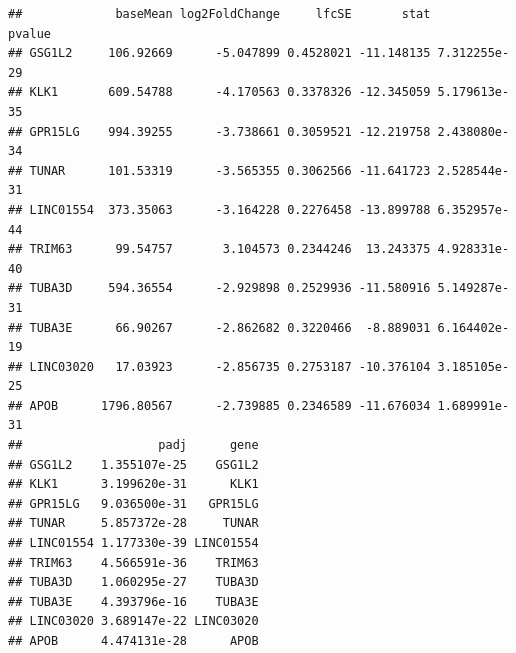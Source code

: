 \documentclass[
]{article}
\newenvironment{Shaded}{\begin{snugshade}}{\end{snugshade}}
\newcommand{\CommentTok}[1]{\textcolor[rgb]{0.56,0.35,0.01}{\textit{#1}}}
\newcommand{\FunctionTok}[1]{\textcolor[rgb]{0.13,0.29,0.53}{\textbf{#1}}}
\newcommand{\NormalTok}[1]{#1}
\newcommand{\OtherTok}[1]{\textcolor[rgb]{0.56,0.35,0.01}{#1}}
\newcommand{\SpecialCharTok}[1]{\textcolor[rgb]{0.81,0.36,0.00}{\textbf{#1}}}
\newcommand{\StringTok}[1]{\textcolor[rgb]{0.31,0.60,0.02}{#1}}
\begin{document}
\begin{verbatim}
##             baseMean log2FoldChange     lfcSE       stat       pvalue
## GSG1L2     106.92669      -5.047899 0.4528021 -11.148135 7.312255e-29
## KLK1       609.54788      -4.170563 0.3378326 -12.345059 5.179613e-35
## GPR15LG    994.39255      -3.738661 0.3059521 -12.219758 2.438080e-34
## TUNAR      101.53319      -3.565355 0.3062566 -11.641723 2.528544e-31
## LINC01554  373.35063      -3.164228 0.2276458 -13.899788 6.352957e-44
## TRIM63      99.54757       3.104573 0.2344246  13.243375 4.928331e-40
## TUBA3D     594.36554      -2.929898 0.2529936 -11.580916 5.149287e-31
## TUBA3E      66.90267      -2.862682 0.3220466  -8.889031 6.164402e-19
## LINC03020   17.03923      -2.856735 0.2753187 -10.376104 3.185105e-25
## APOB      1796.80567      -2.739885 0.2346589 -11.676034 1.689991e-31
##                   padj      gene
## GSG1L2    1.355107e-25    GSG1L2
## KLK1      3.199620e-31      KLK1
## GPR15LG   9.036500e-31   GPR15LG
## TUNAR     5.857372e-28     TUNAR
## LINC01554 1.177330e-39 LINC01554
## TRIM63    4.566591e-36    TRIM63
## TUBA3D    1.060295e-27    TUBA3D
## TUBA3E    4.393796e-16    TUBA3E
## LINC03020 3.689147e-22 LINC03020
## APOB      4.474131e-28      APOB
\end{verbatim}

\begin{Shaded}
\end{Shaded}
\end{document}
